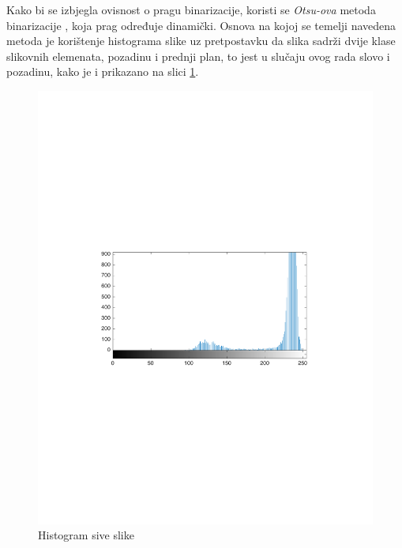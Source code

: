 Kako bi se izbjegla ovisnost o pragu binarizacije, koristi se \emph{Otsu-ova} metoda binarizacije \citep{1979:ots}, koja prag određuje dinamički. Osnova na kojoj se temelji navedena metoda je korištenje histograma slike uz pretpostavku da slika sadrži dvije klase slikovnih elemenata, pozadinu i prednji plan, to jest u slučaju ovog rada slovo i pozadinu, kako je i prikazano na slici \ref{fig:histogram}.
\begin{figure}[htb]
    \centering
    \includegraphics[width=12cm]{images/histogram.pdf}
    \caption{Histogram sive slike}
    \label{fig:histogram}
\end{figure}

